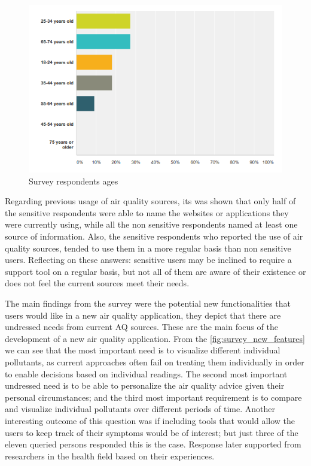 \begin{figure}[H]
\begin{adjustbox}{width=1\textwidth,center=\textwidth}
  \centering
  \includegraphics[scale=1]{images/ages_survey.png}
\end{adjustbox}
  \caption[Survey respondents ages ]{Survey respondents ages}
  \label{fig:survey_ages}
\end{figure}

Regarding previous usage of air quality sources, its was shown that only half of the sensitive respondents were able to name the websites or applications they were currently using, while all the non sensitive respondents named at least one source of information. Also, the sensitive respondents who reported the use of air quality sources, tended to use them in a more regular basis than non sensitive users. Reflecting on these answers: sensitive users may be inclined to require a support tool on a regular basis, but not all of them are aware of their existence or does not feel the current sources meet their needs. 

The main findings from the survey were the potential new functionalities that users would like in a new air quality application, they depict that there are undressed needs from current AQ sources. These are the main focus of the development of a new air quality application. From the \ref{fig:survey_new_features} we can see that the most important need is to visualize different individual pollutants, as current approaches often fail  on treating them individually in order to enable decisions based on individual readings. The second most important undressed need is to be able to personalize the air quality advice given their personal circumstances; and the third most important requirement is to compare and visualize individual pollutants over different periods of time. Another interesting outcome of this question was if including tools that would allow the users to keep track of their symptoms would be of interest; but just three of the eleven queried persons responded this is the case. Response later supported from researchers in the health field based on their experiences. 


